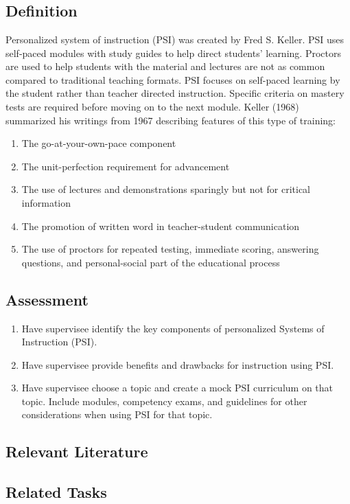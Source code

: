 \clearpage \section{\fourfFive{}}
\subsection{Definition}
Personalized system of instruction (PSI) was created by Fred S. Keller.  PSI uses self-paced modules with study guides to help direct students' learning. Proctors are used to help students with the material and lectures are not as common compared to traditional teaching formats. PSI focuses on self-paced learning by the student rather than teacher directed instruction. Specific criteria on mastery tests are required before moving on to the next module. Keller (1968) summarized his writings from 1967 describing features of this type of training: 
\begin{enumerate}
\item The go-at-your-own-pace component
\item The unit-perfection requirement for advancement
\item The use of lectures and demonstrations sparingly but not for critical information
\item The promotion of written word in teacher-student communication
\item The use of proctors for repeated testing, immediate scoring, answering questions, and personal-social part of the educational process
\end{enumerate}
%
\subsection{Assessment}
\begin{enumerate}
\item Have supervisee identify the key components of personalized Systems of Instruction (PSI).
\item Have supervisee provide benefits and drawbacks for instruction using PSI.
\item Have supervisee choose a topic and create a mock PSI curriculum on that topic. Include modules, competency exams, and guidelines for other considerations when using PSI for that topic. 
%
\end{enumerate}
%
\subsection{Relevant Literature}
\begin{refsection}
\nocite{axelrod1992disseminating,
        buskist1991life,
        keller1994fred,
        keller1968good,
        keller1982psi,
        twyman1998fred,
        eyre2007keller}
\printbibliography[heading=none]
\end{refsection}
%
\subsection{Related Tasks}
\fourfOne{}\\
\fourfFour{}\\
\fourjFourteen{}\\
